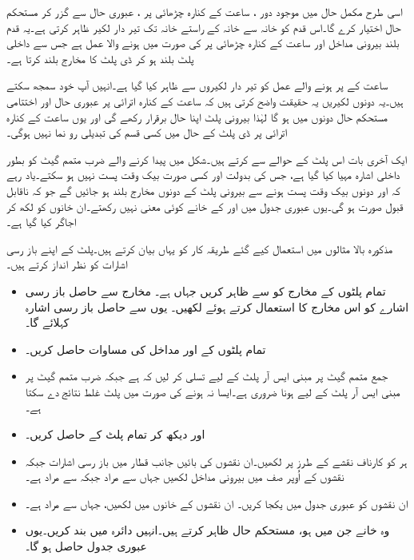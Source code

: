 اسی طرح مکمل حال  میں موجود دور ، ساعت کے کنارہ چڑھائی پر ، عبوری حال  سے گزر کر مستحکم حال  اختیار کرے گا۔اس قدم کو خانہ  سے خانہ  کے راستے خانہ  تک تیر دار لکیر ظاہر کرتی ہے۔یہ قدم بلند بیرونی مداخل  اور ساعت کے کنارہ چڑھائی پر  کی صورت میں ہونے والا عمل ہے جس سے داخلی پلٹ بلند ہو کر ڈی پلٹ کا مخارج بلند  کرتا ہے۔

ساعت کے  پر ہونے والے عمل کو  تیر دار لکیروں سے ظاہر کیا گیا ہے۔انہیں آپ خود سمجھ سکتے ہیں۔یہ دونوں لکیریں یہ حقیقت واضح کرتی ہیں کہ ساعت کے کنارہ اترائی پر عبوری حال اور اختتامی مستحکم حال دونوں میں  ہو گا لہٰذا بیرونی پلٹ اپنا حال برقرار رکھے گی اور یوں ساعت کے کنارہ اترائی پر ڈی پلٹ کے حال میں کسی قسم کی تبدیلی رو نما نہیں ہوگی۔

ایک آخری بات اس پلٹ کے حوالے سے کرتے ہیں۔شکل    میں  پیدا کرنے والے ضرب متمم گیٹ کو  بطور داخلی اشارہ مہیا کیا گیا ہے، جس کی بدولت  اور  کسی صورت بیک وقت پست نہیں ہو سکتے۔یاد رہے کہ  اور  دونوں بیک وقت پست ہونے سے بیرونی پلٹ کے دونوں مخارج بلند ہو جائیں گے جو کہ ناقابل قبول صورت ہو گی۔یوں عبوری جدول میں  اور  کے خانے کوئی معنی نہیں رکھتے۔ان خانوں کو  لکھ کر اجاگر کیا گیا ہے۔

مذکورہ بالا مثالوں میں استعمال کیے گئے طریقہ کار کو یہاں بیان کرتے ہیں۔پلٹ کے اپنے باز رسی اشارات کو نظر انداز کرتے ہیں۔
\begin{itemize}
\item
 تمام پلٹوں کے مخارج کو سے ظاہر کریں جہاں ہے۔ مخارج سے حاصل باز رسی اشارے کو اس مخارج کا  استعمال کرتے ہوئے  لکھیں۔ یوں  سے حاصل باز رسی اشارہ  کہلائے گا۔
\item
 تمام پلٹوں کے  اور  مداخل کی مساوات حاصل کریں۔
\item
 جمع متمم گیٹ پر مبنی ایس آر پلٹ کے لیے تسلی کر لیں کہ  ہے جبکہ ضرب متمم گیٹ پر مبنی ایس آر پلٹ کے لیے  ہونا ضروری ہے۔ایسا نہ ہونے کی صورت میں پلٹ غلط نتائج دے سکتا ہے۔
\item 
{} اور  دیکھ کر تمام پلٹ کے  حاصل کریں۔
\item
 ہر  کو کارناف نقشے کے طرز پر لکھیں۔ان نقشوں کی بائیں جانب قطار میں باز رسی اشارات  جبکہ نقشوں کے اُوپر صف میں بیرونی مداخل  لکھیں جہاں  سے مراد  جبکہ  سے مراد  ہے۔
\item
 ان نقشوں کو عبوری جدول میں یکجا کریں۔ ان نقشوں کے خانوں میں  لکھیں، جہاں  سے مراد  ہے۔
\item
 وہ خانے جن میں  ہو، مستحکم حال ظاہر کرتے ہیں۔انہیں دائرہ میں بند کریں۔یوں عبوری جدول حاصل ہو گا۔
\end{itemize}

